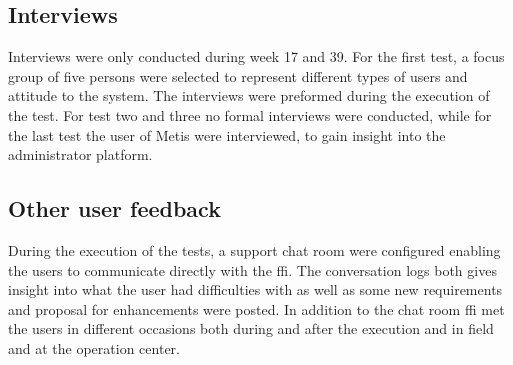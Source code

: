 \subsection{Interviews}
Interviews were only conducted during week 17 and 39. For the first test, a focus group of five persons were selected to represent different types of users and attitude to the system. The interviews were preformed during the execution of the test. For test two and three no formal interviews were conducted, while for the last test the user of Metis were interviewed, to gain insight into the administrator platform. 

\subsection{Other user feedback}
During the execution of the tests, a support chat room were configured enabling the users to communicate directly with the \gls{ffi}. The conversation logs both gives insight into what the user had difficulties with as well as some new requirements and proposal for enhancements were posted. In addition to the chat room \gls{ffi} met the users in different occasions both during and after the execution and in field and at the operation center. 
